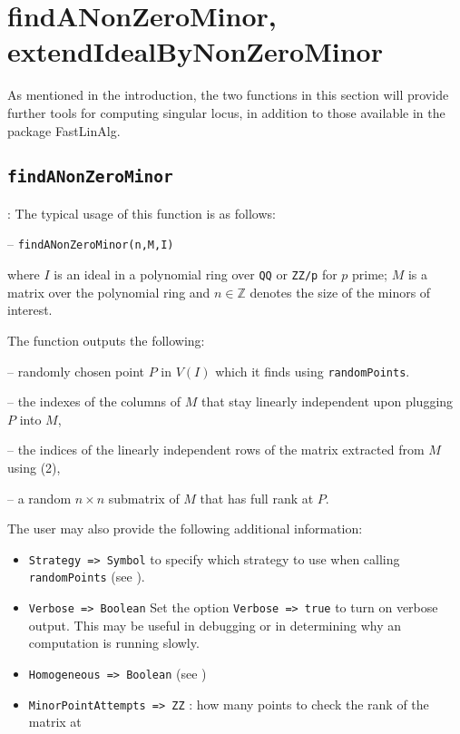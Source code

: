 \documentclass[11pt]{amsart}
\theoremstyle{definition}
\begin{document}
\section{findANonZeroMinor, extendIdealByNonZeroMinor}

As mentioned in the introduction, the two functions in this section will provide further tools for computing singular locus, in addition to those available in the package FastLinAlg. 

	\subsection{\tt findANonZeroMinor}\label{findANonZeroMinor}: The typical usage of this function is as follows: 
	
	\vspace{1em}
	-- {\tt findANonZeroMinor(n,M,I)} 
	
	\vspace{1em}
	\noindent where $I$ is an ideal
	in a polynomial ring over {\tt QQ} or {\tt ZZ/p} for $p$ prime; $M$ is a matrix
	over the polynomial ring and $n\in \mathbb{Z}$ denotes the size of the minors of interest.
	
	The function outputs the following:
	
	-- randomly chosen point $P$ in $V(I)$ which it finds using {\tt randomPoints}.
	
	-- the indexes of the columns of $M$ that stay linearly independent upon plugging $P$ into $M$, 
	
	-- the indices of the linearly independent rows of the matrix extracted from $M$ using (2), 
	
	-- a random $n\times n$ submatrix of $M$ that has full rank at $P$.
	
The user may also provide the following additional information: 

\begin{itemize}
	\item {\tt Strategy => Symbol} to specify which strategy to use when calling {\tt randomPoints} (see ).
	
	\item {\tt Verbose => Boolean}
		 Set the option {\tt Verbose => true} to turn on verbose output.  This may be useful in debugging or in determining why an computation is running slowly.
		 
	\item {\tt Homogeneous => Boolean} (see )
	
	\item {\tt MinorPointAttempts => ZZ} :
	how many points to check the rank of the matrix at
\end{itemize}
\end{document}
